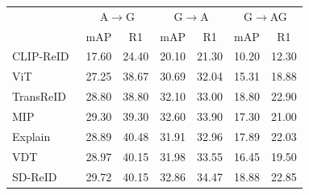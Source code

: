 \documentclass[runningheads]{llncs}
\makeatletter
\let\leaderboards@table\table
\let\leaderboards@endtable\endtable
\renewenvironment{table}[1][]{\leaderboards@table[H]}{\leaderboards@endtable}
\makeatother
\begin{document}
\begin{table}[t]
  \caption{\textbf{Performance comparison on LAGPeR.}
    Best results are in \textbf{bold}.}
  \label{tab:sota_lagper}
  \centering
  \begin{tabular}{lcccccc}
    \Xhline{1.0pt}
    \multirow{2}{*}{Method}
                                     & \multicolumn{2}{c}{A$\rightarrow$G}
                                     & \multicolumn{2}{c}{G$\rightarrow$A}
                                     & \multicolumn{2}{c}{G$\rightarrow$AG}                                                                                                                                \\
    \cmidrule(lr){2-3}\cmidrule(lr){4-5}\cmidrule(lr){6-7}
                                     & \multicolumn{1}{c}{mAP}              & \multicolumn{1}{c}{R1} & \multicolumn{1}{c}{mAP} & \multicolumn{1}{c}{R1} & \multicolumn{1}{c}{mAP} & \multicolumn{1}{c}{R1} \\
    \Xhline{0.6pt}
    CLIP-ReID~\cite{li2023clip}      & 17.60                                & 24.40                  & 20.10                   & 21.30                  & 10.20                   & 12.30                  \\
    ViT~\cite{dosovitskiy2020image}  & 27.25                                & 38.67                  & 30.69                   & 32.04                  & 15.31                   & 18.88                  \\
    TransReID~\cite{he2021transreid} & 28.80                                & 38.80                  & 32.10                   & 33.00                  & 18.80                   & 22.90                  \\
    MIP~\cite{wu2024enhancing}       & 29.30                                & 39.30                  & 32.60                   & 33.90                  & 17.30                   & 21.00                  \\
    \Xhline{0.6pt}
    Explain~\cite{nguyen2023aerial}  & 28.89                                & 40.48                  & 31.91                   & 32.96                  & 17.89                   & 22.03                  \\
    VDT~\cite{zhang2024view}         & 28.97                                & 40.15                  & 31.98                   & 33.55                  & 16.45                   & 19.50                  \\
    SD-ReID~\cite{wang2026sd}        & 29.72                                & 40.15                  & 32.86                   & 34.47                  & 18.88                   & 22.85                  \\

\end{tabular}
\end{table}
\end{document}

